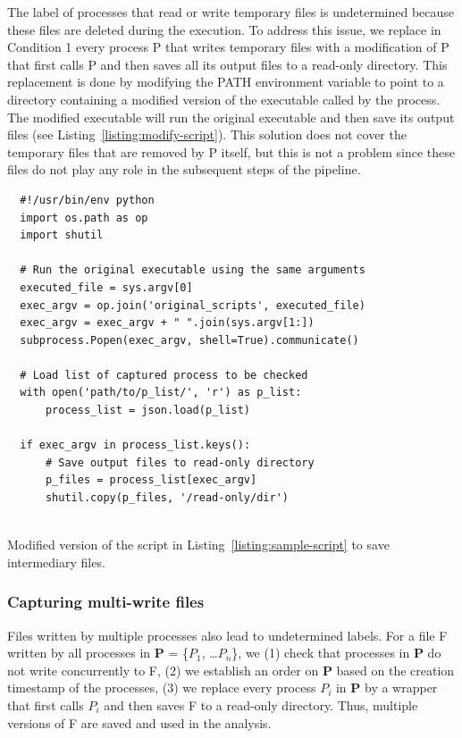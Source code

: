 \documentclass[a4paper,num-refs]{oup-contemporary}
\begin{document}
The label of processes that read or 
write temporary files is undetermined because these files are deleted during 
the execution. To address this issue, we replace in Condition 1 every process P that 
writes temporary files with a modification of P that first calls P and then
saves all its output files to a read-only directory. This replacement is
done by modifying the PATH environment variable to point to a directory
containing a modified version of the executable called by the process. The
modified executable will run the original executable and then save its
output files (see Listing~\ref{listing:modify-script}). 
This 
solution does not cover the temporary files that are removed by P 
itself, but this is not a problem since these files do not play any role in 
the subsequent steps of the pipeline. 

\begin{listing}
  \begin{verbatim}
  #!/usr/bin/env python
  import os.path as op
  import shutil

  # Run the original executable using the same arguments
  executed_file = sys.argv[0]
  exec_argv = op.join('original_scripts', executed_file)
  exec_argv = exec_argv + " ".join(sys.argv[1:])
  subprocess.Popen(exec_argv, shell=True).communicate()
  
  # Load list of captured process to be checked
  with open('path/to/p_list/', 'r') as p_list:
      process_list = json.load(p_list)

  if exec_argv in process_list.keys():
      # Save output files to read-only directory
      p_files = process_list[exec_argv]
      shutil.copy(p_files, '/read-only/dir')
  
  \end{verbatim}
    \caption{Modified version of the script in Listing~\ref{listing:sample-script} to save intermediary files.}
    \label{listing:modify-script}
  \end{listing}

\subsubsection{Capturing multi-write files}

Files written by multiple processes also lead 
to undetermined labels. For a file F 
written by all processes in \textbf{P} = \{$P_{1}$, \ldots $P_{n}$\}, we 
(1) check that processes in \textbf{P} do not write concurrently to F, 
(2) we establish an order on \textbf{P} based on the creation timestamp 
of the processes, (3) we replace every process $P_{i}$ in \textbf{P} by 
a wrapper that first calls $P_{i}$ and then saves F to a read-only 
directory. Thus, multiple versions of F are saved and used in the 
analysis. 
\end{document}
